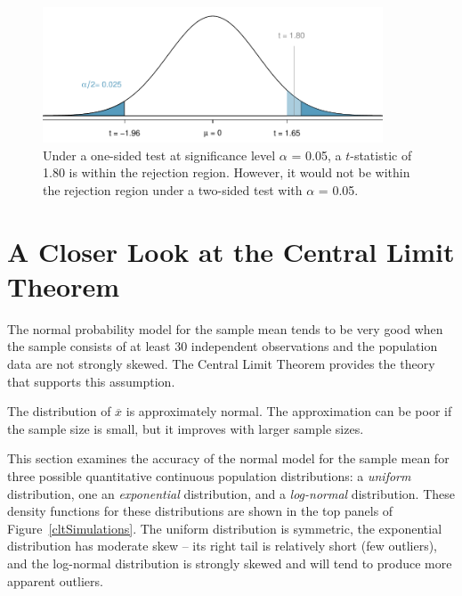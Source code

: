 \begin{spacing}{1.5}
\begin{figure}[h]
	\centering
	\includegraphics[width=0.9\textwidth]
	{ch_inference_foundations_oi_biostat/figures/twoSidedTestConservative/twoSidedTestConservative}
	\caption{Under a one-sided test at significance level $\alpha$ = 0.05, a $t$-statistic of 1.80 is within the rejection region. However, it would not be within the rejection region under a two-sided test with $\alpha$ = 0.05.}
	\label{twoSidedTestConservative}
\end{figure}

\section[A Closer Look at the Central Limit Theorem]{A Closer Look at the Central Limit Theorem} %
\label{cltSection}


The normal probability model for the sample mean tends to be very good when the sample consists of at least 30 independent observations and the population data are not strongly skewed. The Central Limit Theorem provides the theory that supports this assumption.

\begin{termBox}{
The distribution of $\overline{x}$ is approximately normal. The approximation can be poor if the sample size is small, but it improves with larger sample sizes.}
\end{termBox}


This section examines the accuracy of the normal model for the sample mean for three possible quantitative continuous population distributions:  a \emph{uniform} distribution, one an \emph{exponential} distribution, and a \emph{log-normal} distribution. These density functions for these distributions are shown in the top panels of Figure~\ref{cltSimulations}. The uniform distribution is symmetric, the exponential distribution has moderate skew -- its right tail is relatively short (few outliers), and the log-normal distribution is strongly skewed and will tend to produce more apparent outliers.


\end{spacing}
